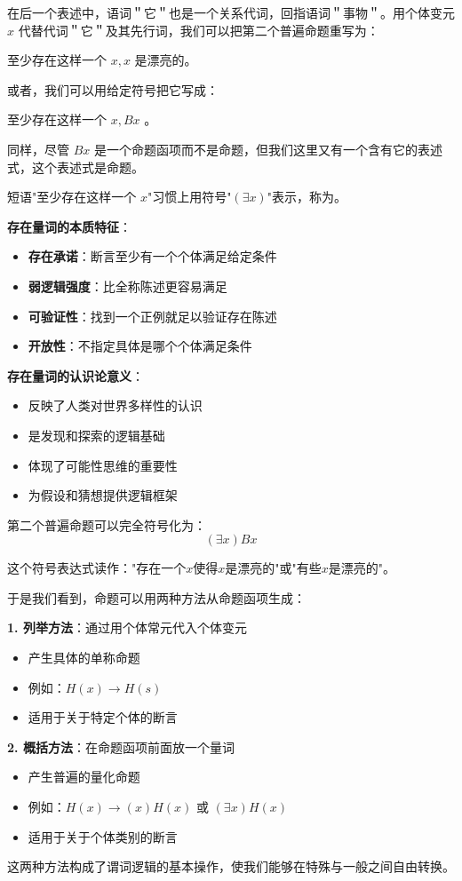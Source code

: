 在后一个表述中，语词＂它＂也是一个关系代词，回指语词＂事物＂。用个体变元 $x$ 代替代词＂它＂及其先行词，我们可以把第二个普遍命题重写为：

至少存在这样一个 $x, x$ 是漂亮的。

或者，我们可以用给定符号把它写成：

至少存在这样一个 $x, B x$ 。

同样，尽管 $B x$ 是一个命题函项而不是命题，但我们这里又有一个含有它的表述式，这个表述式是命题。

\begin{theorembox}[title=存在量词的深入分析]
短语"至少存在这样一个 $x$"习惯上用符号"$(\exists x)$"表示，称为。

\textbf{存在量词的本质特征}：
\begin{itemize}
\item \textbf{存在承诺}：断言至少有一个个体满足给定条件
\item \textbf{弱逻辑强度}：比全称陈述更容易满足
\item \textbf{可验证性}：找到一个正例就足以验证存在陈述
\item \textbf{开放性}：不指定具体是哪个个体满足条件
\end{itemize}

\textbf{存在量词的认识论意义}：
\begin{itemize}
\item 反映了人类对世界多样性的认识
\item 是发现和探索的逻辑基础
\item 体现了可能性思维的重要性
\item 为假设和猜想提供逻辑框架
\end{itemize}
\end{theorembox}

第二个普遍命题可以完全符号化为：
$$(\exists x) B x$$

这个符号表达式读作："存在一个$x$使得$x$是漂亮的"或"有些$x$是漂亮的"。

\begin{examplebox}[title=两种生成方法的总结]
于是我们看到，命题可以用两种方法从命题函项生成：

\textbf{1. 列举方法}：通过用个体常元代入个体变元
\begin{itemize}
\item 产生具体的单称命题
\item 例如：$H(x) \rightarrow H(s)$
\item 适用于关于特定个体的断言
\end{itemize}

\textbf{2. 概括方法}：在命题函项前面放一个量词
\begin{itemize}
\item 产生普遍的量化命题
\item 例如：$H(x) \rightarrow (x)H(x)$ 或 $(\exists x)H(x)$
\item 适用于关于个体类别的断言
\end{itemize}

这两种方法构成了谓词逻辑的基本操作，使我们能够在特殊与一般之间自由转换。
\end{examplebox}

